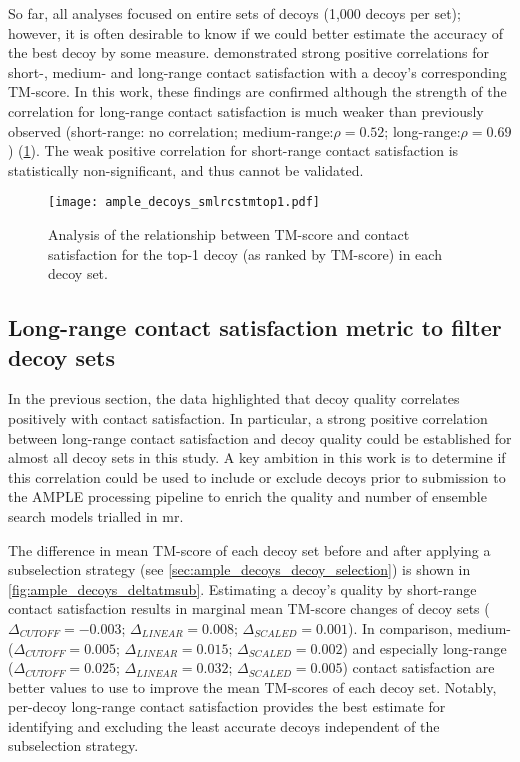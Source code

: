 So far, all analyses focused on entire sets of decoys (1,000 decoys per set); however, it is often desirable to know if we could better estimate the accuracy of the best decoy by some measure. \textcite{Kosciolek2014-bt} demonstrated strong positive correlations for short-, medium- and long-range contact satisfaction with a decoy's corresponding TM-score. In this work, these findings are confirmed although the strength of the correlation for long-range contact satisfaction is much weaker than previously observed (short-range: no correlation; medium-range:$\rho=0.52$; long-range:$\rho=0.69$) (\cref{fig:ample_decoys_smlrcstmtop1}). The weak positive correlation for short-range contact satisfaction is statistically non-significant, and thus cannot be validated. 

\begin{figure}[H]
	\centering
        \texttt{[image: ample\_decoys\_smlrcstmtop1.pdf]}
        \caption[Top-1 decoy TM-score and contact satisfaction analysis]{Analysis of the relationship between TM-score and contact satisfaction for the top-1 decoy (as ranked by TM-score) in each decoy set.}
	\label{fig:ample_decoys_smlrcstmtop1}
\end{figure}

\subsection{Long-range contact satisfaction metric to filter decoy sets}
In the previous section, the data highlighted that decoy quality correlates positively with contact satisfaction. In particular, a strong positive correlation between long-range contact satisfaction and decoy quality could be established for almost all decoy sets in this study. A key ambition in this work is to determine if this correlation could be used to include or exclude decoys prior to submission to the AMPLE processing pipeline to enrich the quality and number of ensemble search models trialled in \gls{mr}.

The difference in mean TM-score of each decoy set before and after applying a subselection strategy (see \cref{sec:ample_decoys_decoy_selection}) is shown in \cref{fig:ample_decoys_deltatmsub}. Estimating a decoy's quality by short-range contact satisfaction results in marginal mean TM-score changes of decoy sets ($\Delta_{CUTOFF}=-0.003$; $\Delta_{LINEAR}=0.008$; $\Delta_{SCALED}=0.001$). In comparison, medium- ($\Delta_{CUTOFF}=0.005$; $\Delta_{LINEAR}=0.015$; $\Delta_{SCALED}=0.002$) and especially long-range ($\Delta_{CUTOFF}=0.025$; $\Delta_{LINEAR}=0.032$; $\Delta_{SCALED}=0.005$) contact satisfaction are better values to use to improve the mean TM-scores of each decoy set. Notably, per-decoy long-range contact satisfaction provides the best estimate for identifying and excluding the least accurate decoys independent of the subselection strategy. 


